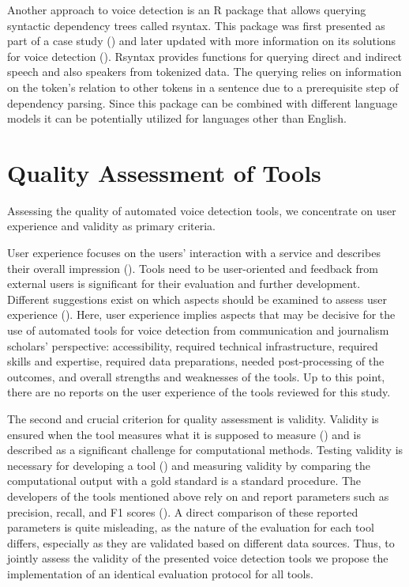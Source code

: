 \documentclass{ccr}
\begin{document}
Another approach to voice detection is an R package that allows querying syntactic dependency trees called rsyntax. This package was first presented as part of a case study (\cite{vanatteveldt2017clause}) and later updated with more information on its solutions for voice detection (\cite{welbers2021extracting}). Rsyntax provides functions for querying direct and indirect speech and also speakers from tokenized data. The querying relies on information on the token’s relation to other tokens in a sentence due to a prerequisite step of dependency parsing. Since this package can be combined with different language models it can be potentially utilized for languages other than English.

\section{Quality Assessment of Tools}
Assessing the quality of automated voice detection tools, we concentrate on user experience and validity as primary criteria.

User experience focuses on the users’ interaction with a service and describes their overall impression (\cite{hassenzahl2006user}). Tools need to be user-oriented and feedback from external users is significant for their evaluation and further development. Different suggestions exist on which aspects should be examined to assess user experience (\cite{laugwitz2006konstruktion}). Here, user experience implies aspects that may be decisive for the use of automated tools for voice detection from communication and journalism scholars’ perspective: accessibility, required technical infrastructure, required skills and expertise, required data preparations, needed post-processing of the outcomes, and overall strengths and weaknesses of the tools. Up to this point, there are no reports on the user experience of the tools reviewed for this study.

The second and crucial criterion for quality assessment is validity. Validity is ensured when the tool measures what it is supposed to measure (\cite{krippendorff2004reliability}) and is described as a significant challenge for computational methods. Testing validity is necessary for developing a tool (\cite{grimmer2013text}) and measuring validity by comparing the computational output with a gold standard is a standard procedure. The developers of the tools mentioned above rely on and report parameters such as precision, recall, and F1 scores (\cite{pareti2013automatically, muzny2017two, scheible2016model}). A direct comparison of these reported parameters is quite misleading, as the nature of the evaluation for each tool differs, especially as they are validated based on different data sources. Thus, to jointly assess the validity of the presented voice detection tools we propose the implementation of an identical evaluation protocol for all tools.
\end{document}
